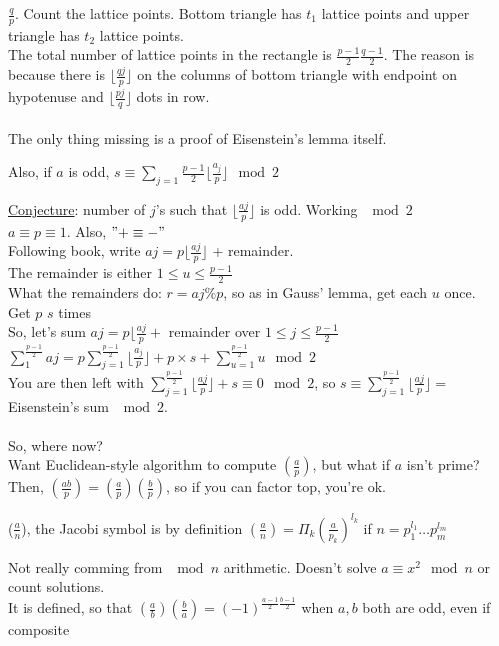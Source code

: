   $\frac{q}{p}$. Count the lattice points. Bottom triangle has $t_1$ lattice
  points and upper triangle has $t_2$ lattice points.\\
  The total number of lattice points in the rectangle is 
  $\frac{p-1}{2}\frac{q-1}{2}$. The reason is because there is $\lfloor
  \frac{qj}{p} \rfloor$ on the columns of bottom triangle with endpoint on 
  hypotenuse and $\lfloor \frac{pj}{q} \rfloor$ dots in row.\\\\
  The only thing missing is a proof of Eisenstein's lemma itself.\\
  \begin{lemma}
    Also, if $a$ is odd, $s \equiv \sum_{j = 1}{\frac{p-1}{2}}
      \lfloor \frac{a_j}{p} \rfloor \mod 2$
  \end{lemma}
  \underline{Conjecture}: number of $j$'s such that $\lfloor \frac{aj}{p} \rfloor$ is odd. 
  Working $\mod 2$\\
  $a \equiv p \equiv 1$. Also, $"+ \equiv -"$\\
  Following book, write $aj = p \lfloor \frac{aj}{p} \rfloor$ + remainder.\\
  The remainder is either $1 \le u \le \frac{p-1}{2}$\\
  What the remainders do: $r = aj \% p$, so as in Gauss' lemma, get each $u$ 
  once.\\
  Get $p$ $s$ times \\
  So, let's sum $aj = p \lfloor \frac{aj}{p} + $ remainder over $1 \le j \le
  \frac{p-1}{2}$\\
  $\sum_{1}^{\frac{p-1}{2}} aj = p\sum_{j = 1}^{\frac{p-1}{2}}\lfloor
  \frac{a_j}{p} \rfloor + p \times s + \sum_{u = 1}^{\frac{p-1}{2}} u \mod 2$\\
  You are then left with
  $\sum_{j = 1}^{\frac{p-1}{2}} \lfloor \frac{aj}{p} \rfloor + s \equiv 0 \mod 
  2$, so
  $s \equiv \sum_{j = 1}^{\frac{p-1}{2}} \lfloor \frac{aj}{p} \rfloor =
  $ Eisenstein's sum $\mod 2$.\\\\
  So, where now?\\
  Want Euclidean-style algorithm to compute $(\frac{a}{p})$, but what if
  $a$ isn't prime? Then, $(\frac{ab}{p}) = (\frac{a}{p})(\frac{b}{p})$, so
  if you can factor top, you're ok.\\
  \begin{definition}
    ($\frac{a}{n}$), the Jacobi symbol is by definition $(\frac{a}{n}) = 
    \Pi_{k} (\frac{a}{p_k})^{l_k}$ if $n = p_1^{l_1} \ldots p_m^{l_m}$\\
  \end{definition}
  Not really comming from $\mod n$ arithmetic. Doesn't solve $a \equiv x^2 
  \mod n$ or count solutions.\\
  It is defined, so that $(\frac{a}{b})(\frac{b}{a}) = (-1)^{\frac{a-1}{2}\frac{b-1}{2}}$ when $a,b$ both are odd, even if composite
